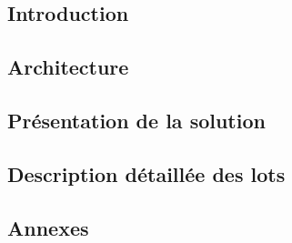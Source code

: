 \documentclass[asi]{picInsa}
\title{\DSI{}}
\author{\Pierre} %
\begin{document}
\couverture{}

 \informationsGenerales{}
%

\tableofcontents

\setcounter{chapter}{0}


\chapter*{Introduction}
\label{intro}


\chapter{Architecture}
\label{architecture}


\chapter{Présentation de la solution}
\label{presentation}


\chapter{Description détaillée des lots}
\label{description}



\begin{appendix}
\part*{Annexes}

\listoffigures
{}
	 
\listoftables
{}
\end{appendix}
\pageQuatriemeCouverture
\end{document}
